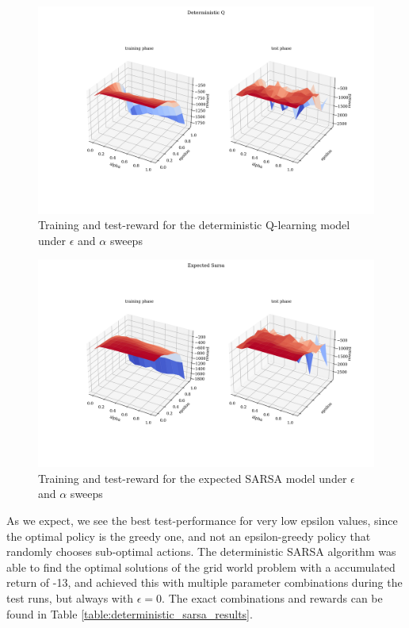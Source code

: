 \begin{figure}[H]
    \centering
    \includegraphics[width=1\linewidth]{../plots/det_Q_alpha_eps.png}  
    \caption{Training and test-reward for the deterministic Q-learning model under $\epsilon$ and $\alpha$ sweeps}
    \label{fig:det_Q_alpha_eps}
\end{figure}



\begin{figure}[H]
    \centering
    \includegraphics[width=1\linewidth]{../plots/expected_sarsa_alpha_eps.png}  
    \caption{Training and test-reward for the expected SARSA model under $\epsilon$ and $\alpha$ sweeps}
    \label{fig:expected_sarsa_alpha_eps}
\end{figure}

As we expect, we see the best test-performance for very low epsilon values, since the optimal policy is the greedy one, and not an epsilon-greedy policy that randomly chooses sub-optimal actions.
The deterministic SARSA algorithm was able to find the optimal solutions of the grid world problem with a accumulated return of -13, and achieved this with multiple parameter combinations during the test runs, but always with $\epsilon = 0$. The exact combinations and rewards can be found in Table \ref{table:deterministic_sarsa_results}.


